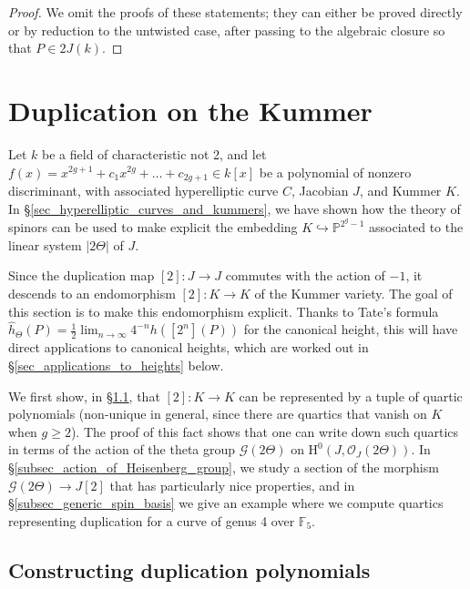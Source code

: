\documentclass{article} %
\numberwithin{equation}{section}
\renewcommand{\P}{\mathbb{P}}
\newcommand{\HH}{\mathrm{H}}
\newcommand{\cO}{\mathcal{O}}
\newcommand{\F}{\mathbb{F}}
\begin{document}
\begin{proof}
    We omit the proofs of these statements; they can either be proved directly or by reduction to the untwisted case, after passing to the algebraic closure so that $P \in 2 J(k)$.
\end{proof}

\section{Duplication on the Kummer}\label{sec_duplication_on_the_Kummer}

Let $k$ be a field of characteristic not 2, and let $f(x)  = x^{2g+1} +  c_1 x^{2g} + \dots + c_{2g+1} \in k[x]$ be a polynomial of nonzero discriminant, with associated hyperelliptic curve $C$, Jacobian $J$, and Kummer $K$. In \S \ref{sec_hyperelliptic_curves_and_kummers}, we have shown how the theory of spinors can be used to make explicit the embedding $K \hookrightarrow \P^{2^g-1}$ associated to the linear system $|2 \Theta|$ of $J$. 

Since the duplication map $[2] : J \to J$ commutes with the action of $-1$, it descends to an endomorphism $[2] : K \to K$ of the Kummer variety. The goal of this section is to make this endomorphism explicit. Thanks to Tate's formula $\widehat{h}_\Theta(P) = \frac{1}{2} \lim_{n \to \infty} 4^{-n} h([2^n](P))$ for the canonical height, this will have direct applications to canonical heights, which are worked out in \S \ref{sec_applications_to_heights} below. 

We first show, in \S \ref{subsec_duplication_on_the_kummer}, that $[2] : K \to K$ can be represented by a tuple of quartic polynomials (non-unique in general, since there are quartics that vanish on $K$ when $g \geq 2$). The proof of this fact shows that one can write down such quartics in terms of the action of the theta group $\mathcal{G}(2 \Theta)$ on $\HH^0(J, \cO_{J}(2 \Theta))$. In \S \ref{subsec_action_of_Heisenberg_group}, we study a section of the morphism $\mathcal{G}(2 \Theta) \to J[2]$ that has particularly nice properties, and in \S\ref{subsec_generic_spin_basis} we give an example where we compute quartics representing duplication for a curve of genus 4 over $\F_5$.  

\subsection{Constructing duplication polynomials}\label{subsec_duplication_on_the_kummer}
\end{document}
